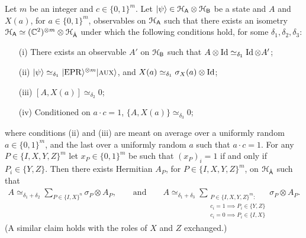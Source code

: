 \begin{lemma}\label{lem:pauli-c-n}
Let $m$ be an integer and $c\in\{0,1\}^m$. Let $|\psi\rangle \in \mathcal{H}_{{\textsf{A}}} \otimes \mathcal{H}_{{\textsf{B}}}$ be a state and $A$ and $X(a)$, for $a\in\{0,1\}^m$, observables on $\mathcal{H}_{{\textsf{A}}}$ such that there exists an isometry $\mathcal{H}_{{\textsf{A}}} \simeq ({\mathbb C}^2)^{\otimes m}\otimes \mathcal{H}_{\hat{{\textsf{A}}}}$ under which the following conditions hold, for some $\delta_1,\delta_2,\delta_3$:
\begin{enumerate}
\item[(i)] There exists an observable $A'$ on $\mathcal{H}_{\textsf{B}}$ such that $A\otimes \mathop{\rm Id}\nolimits \simeq_{\delta_1} \mathop{\rm Id}\nolimits \otimes A'$;
\item[(ii)] $|\psi\rangle \simeq_{\delta_1} |{\rm EPR}\rangle^{\otimes m}|\textsc {aux}\rangle$, and $X(a)\simeq_{\delta_1} \sigma_X(a) \otimes \mathop{\rm Id}\nolimits$;
\item[(iii)] $[A,X(a)]\simeq_{\delta_2} 0$;
\item[(iv)] Conditioned on $a\cdot c=1$, $\{A,X(a)\} \simeq_{\delta_3} 0$;
\end{enumerate}
where conditions (ii) and (iii) are meant on average over a uniformly random
  $a\in\{0,1\}^m$, and the last over a uniformly random $a$ such that $a\cdot c
  =1$. For any $P\in\{I,X,Y,Z\}^m$ let $x_P \in\{0,1\}^m$ be such that $(x_P)_i=1$ if and only if $P_i\in\{Y,Z\}$.
Then there exists Hermitian $A_P$, for $P\in\{I,X,Y,Z\}^m$, on $\mathcal{H}_{\hat{{\textsf{A}}}}$ such that 
\begin{align*}
A \simeq_{\delta_1+\delta_2} \sum_{P\in\{I,X\}^n} \sigma_P \otimes A_P,\qquad\text{and}\qquad A \simeq_{\delta_1+\delta_3} \sum_{\substack{P\in\{I,X,Y,Z\}^m:\\ c_i=1 \implies P_i \in \{Y,Z\}\\  c_i=0 \implies P_i \in \{I,X\}}} \sigma_P \otimes A_P.
\end{align*}
 (A similar claim holds with the roles of $X$ and $Z$ exchanged.)
\end{lemma}

